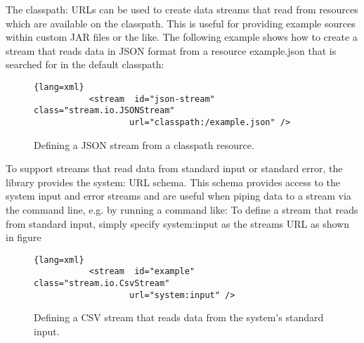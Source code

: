 The {\ttfamily classpath:} URLs can be used to create data streams
that read from resources which are available on the classpath. This is
useful for providing example sources within custom JAR files or the
like. The following example shows how to create a stream that reads
data in JSON format from a resource {\ttfamily example.json} that is
searched for in the default classpath:
\begin{figure}[h!]
        \centering
        \begin{lstlisting}{lang=xml}
           <stream  id="json-stream"  class="stream.io.JSONStream"
                   url="classpath:/example.json" />
        \end{lstlisting}
        \caption{\label{fig:jsonStreamClasspath}Defining a JSON stream from a classpath resource.}
\end{figure}

To support streams that read data from standard input or standard
error, the library provides the {\ttfamily system:} URL schema. This
schema provides access to the system input and error streams and are
useful when piping data to a stream via the command line, e.g. by
running a command like:
To define a stream that reads from standard input, simply specify
{\ttfamily system:input} as the streams URL as shown in figure
\begin{figure}[h1]
        \centering
        \begin{lstlisting}{lang=xml}
           <stream  id="example"  class="stream.io.CsvStream"
                   url="system:input" />
        \end{lstlisting}
        \caption{\label{fig:csvStreamStdin}Defining a CSV stream that reads data from the system's standard input.}
\end{figure}

\newpage












%
%
%
%
%
%
%
%
%
%
%
